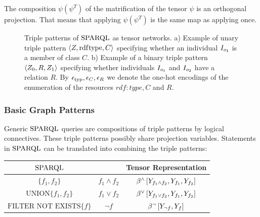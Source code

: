 The composition $\psi (\psi^T)$ of the matrification of the tensor $\psi$ is an orthogonal projection.
That means that applying $\psi (\psi^T)$ is the same map as applying once.


\begin{figure}[t]
    \begin{center}
        
    \end{center}
    \caption{Triple patterns of $\mathrm{SPARQL}$ as tensor networks.
    a) Example of unary triple pattern $\braket{Z,\mathrm{rdf}\mathrm{type},C}$ specifying whether an individual $I_{o_{1}}$ is a member of class $C$.
    b) Example of a binary triple pattern $\braket{Z_{0},R,Z_{1}}$ specifying whether individuals $I_{o_{1}}$ and $I_{o_{2}}$ have a relation $R$.
    By $\epsilon_{\mathrm{typ}},\epsilon_{C},\epsilon_{R}$ we denote the one-hot encodings of the enumeration of the resources $rdf:type, C$ and $R$.
    }
    \label{fig:triplePatterns}
\end{figure}




\subsubsection{Basic Graph Patterns}

Generic $\mathrm{SPARQL}$ queries are compositions of triple patterns by logical connectives. %
These triple patterns possibly share projection variables.
Statements in $\mathrm{SPARQL}$ can be translated into \propositionalLogic{} combining the triple patterns:
\begin{center}
    \begin{tabular}{|c|c|c|}
        \hline
        \textbf{$\mathrm{SPARQL}$}                                        & \textbf{\PropositionalLogic{}} & \textbf{Tensor Representation}                                                                   \\
        \hline
        $\{f_1, f_2\}$                                            & $f_1\land f_2$                 & $\bencodingofat{\land}{\headvariableof{f_1\land f_2},\headvariableof{f_1},\headvariableof{f_2}}$ \\
        \hline
        $\mathrm{UNION}\{f_1, f_2\} $                             & $f_1\lor f_2$                  & $\bencodingofat{\lor}{\headvariableof{f_1\lor f_2},\headvariableof{f_1},\headvariableof{f_2}}$   \\
        \hline
        $\mathrm{FILTER}\,\,\mathrm{NOT}\,\,\mathrm{EXISTS}\{f\}$ & $\lnot f$                      & $\bencodingofat{\lnot}{\headvariableof{\lnot f},\headvariableof{f}}$                             \\
        \hline
    \end{tabular}
\end{center}

